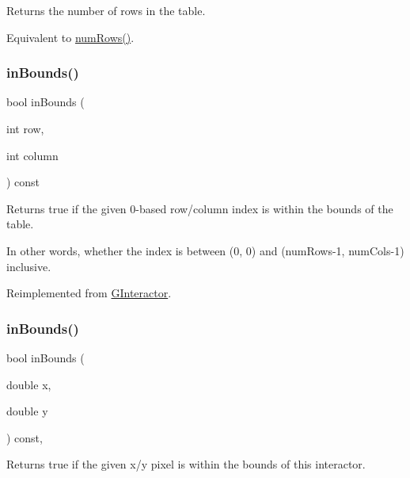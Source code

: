 Returns the number of rows in the table. 

Equivalent to \mbox{\hyperlink{classGTable_a00b7e69dd5c43e42cc91db26c459ad8b}{num\+Rows()}}. \mbox{\label{classGTable_afa6b6241d2f7af75f2d1345f46acfc35}} 
\subsubsection{\texorpdfstring{in\+Bounds()}{inBounds()}\hspace{0.1cm}{\footnotesize\ttfamily [1/2]}}
{\footnotesize\ttfamily bool in\+Bounds (\begin{DoxyParamCaption}\item[{int}]{row,  }\item[{int}]{column }\end{DoxyParamCaption}) const\hspace{0.3cm}{\ttfamily [virtual]}}



Returns true if the given 0-\/based row/column index is within the bounds of the table. 

In other words, whether the index is between (0, 0) and (num\+Rows-\/1, num\+Cols-\/1) inclusive. 

Reimplemented from \mbox{\hyperlink{classGInteractor_ae6d7982c1c627b677a5e776ca86118ed}{G\+Interactor}}.

\mbox{\label{classGInteractor_afc480f652b8c5f1fb255e2269ce68879}} 
\subsubsection{\texorpdfstring{in\+Bounds()}{inBounds()}\hspace{0.1cm}{\footnotesize\ttfamily [2/2]}}
{\footnotesize\ttfamily bool in\+Bounds (\begin{DoxyParamCaption}\item[{double}]{x,  }\item[{double}]{y }\end{DoxyParamCaption}) const\hspace{0.3cm}{\ttfamily [virtual]}, {\ttfamily [inherited]}}



Returns true if the given x/y pixel is within the bounds of this interactor. 

